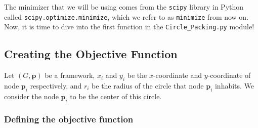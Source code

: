 \begin{flushleft}
The minimizer that we will be using comes from the \texttt{scipy} \cite{scipy} library in Python called \texttt{scipy.optimize.minimize}, which we refer to as \texttt{minimize} from now on. Now, it is time to dive into the first function in the \texttt{Circle\_Packing.py} module!
\end{flushleft}

\subsection{Creating the Objective Function}

\begin{flushleft}
Let $(G, \mathbf{p})$ be a framework, $x_i$ and $y_i$ be the $x$-coordinate and $y$-coordinate of node $\textbf{p}_i$ respectively, and $r_i$ be the radius of the circle that node $\textbf{p}_i$ inhabits. We consider the node $\textbf{p}_i$ to be the center of this circle.
\end{flushleft}

\subsubsection{Defining the objective function}

